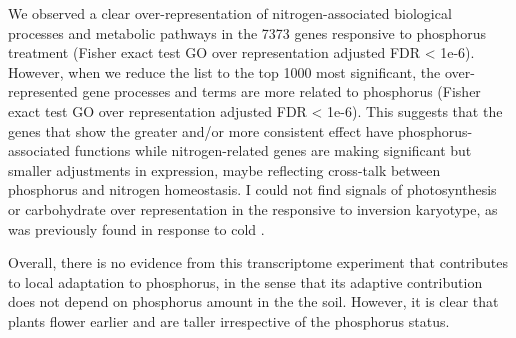 We observed a clear over-representation of nitrogen-associated biological processes and metabolic pathways in the 7373 genes responsive to phosphorus treatment (Fisher exact test GO over representation adjusted FDR < 1e-6). 
However, when we reduce the list to the top 1000 most significant, the over-represented gene processes and terms are more related to phosphorus (Fisher exact test GO over representation adjusted FDR < 1e-6). 
This suggests that the genes that show the greater and/or more consistent effect  have phosphorus-associated functions while nitrogen-related genes are making significant but smaller adjustments in expression, maybe reflecting cross-talk between phosphorus and nitrogen homeostasis\citep{torres-rodriguez2021}.
I could not find signals of photosynthesis or carbohydrate over representation in the \invfour responsive to inversion karyotype, as was previously found in response to cold \citep{crow2020}.
 
Overall, there is no evidence from this transcriptome experiment that \invfour contributes to local adaptation to phosphorus, in the sense that its adaptive contribution does not depend on phosphorus amount in the the soil.
However, it is clear that \invfour plants flower earlier and are taller irrespective of the phosphorus status.

\newpage

\printbibliography[heading=subbibnumbered, title=References]


